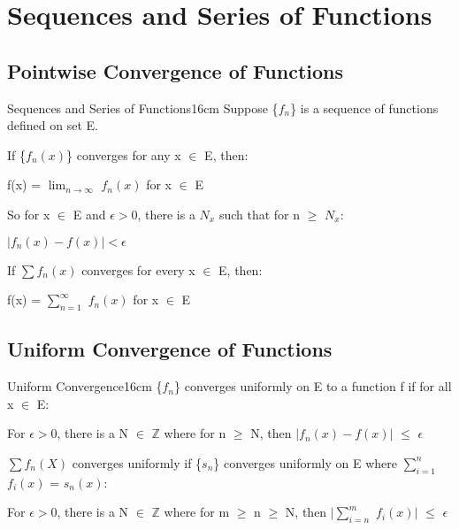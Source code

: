 \newpage

\section[Day 14: Sequences \textbackslash \ Series of Functions]
{ Sequences and Series of Functions }

\subsection[ Convergence ]{ Pointwise Convergence of Functions }

    \begin{definition}{Sequences and Series of Functions}{16cm}
        Suppose \{$f_n$\} is a sequence of functions defined on set E.

        If \{$f_n(x)$\} converges for any x $\in$ E, then:

        \hspace{0.5cm}
        f(x) = $\lim_{n \rightarrow \infty}$ $f_n(x)$ for x $\in$ E

        So for x $\in$ E and $\epsilon > 0$, there is a $N_x$ such that
        for n $\geq$ $N_x$:

        \hspace{0.5cm}
        $|f_n(x) - f(x)| < \epsilon$

        \vspace{0.3cm}

        If $\sum f_n(x)$ converges for every x $\in$ E, then:

        \hspace{0.5cm}
        f(x) = $\sum_{n=1}^{\infty}$ $f_n(x)$ for x $\in$ E        
    \end{definition}

    \vspace{0.5cm}





\subsection[ Uniform Convergence ]{ Uniform Convergence of Functions }

    \begin{definition}{Uniform Convergence}{16cm}
        \{$f_n$\} {\color{lblue} converges uniformly} on E to a function f
        if for all x $\in$ E:
        
        \hspace{0.5cm}
        For $\epsilon > 0$, there is a N $\in$ $\mathbb{Z}$ where for n $\geq$ N,
        then $|f_n(x) - f(x)|$ $\leq$ $\epsilon$

        \vspace{0.3cm}

        $\sum f_n(X)$ converges uniformly if \{$s_n$\} converges uniformly on E
        where $\sum_{i=1}^n$ $f_i(x)$ = $s_n(x)$:

        \hspace{0.5cm}
        For $\epsilon > 0$, there is a N $\in$ $\mathbb{Z}$ where for
        m $\geq$ n $\geq$ N, then
        $|\sum_{i=n}^m$ $f_i(x)|$
        $\leq$ $\epsilon$        
    \end{definition}

